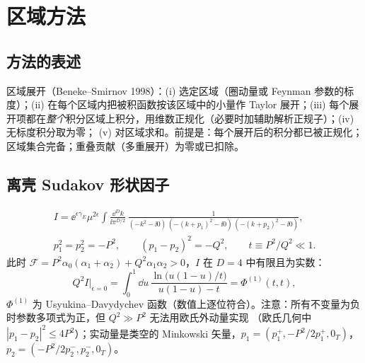 \section{区域方法}
\label{sec:regions}

\subsection{方法的表述}

区域展开（Beneke--Smirnov 1998）：(i) 选定区域（圈动量或 Feynman 参数的标度）；(ii) 在每个区域内把被积函数按该区域中的小量作
Taylor 展开；(iii) 每个展开项都在\emph{整个}积分区域上积分，用维数正规化（必要时加辅助解析正规子）；(iv) 无标度积分取为零；
(v) 对区域求和。前提是：每个展开后的积分都已被正规化；区域集合完备；重叠贡献（多重展开）为零或已扣除。

\subsection{离壳 Sudakov 形状因子}

\begin{gather}\label{eq:reg-I}
I=\ee^{\epsilon\gamma_E}\mu^{2\epsilon}\!\int\!\frac{\dd^Dk}{\ii\pi^{D/2}}\,
\frac{1}{(-k^2-\ii0)\,(-(k+p_1)^2-\ii0)\,(-(k+p_2)^2-\ii0)},\\
p_1^2=p_2^2=-P^2,\qquad (p_1-p_2)^2=-Q^2,\qquad t\equiv P^2/Q^2\ll1 .\nonumber
\end{gather}
此时 $\mathcal F=P^2\alpha_0(\alpha_1+\alpha_2)+Q^2\alpha_1\alpha_2>0$，$I$ 在 $D=4$ 中有限且为实数：
\begin{equation}\label{eq:reg-exact}
Q^2I\big|_{\epsilon=0}=\int_0^1\!\dd u\,\frac{\ln\big(u(1-u)/t\big)}{u(1-u)-t}=\Phi^{(1)}(t,t),
\end{equation}
$\Phi^{(1)}$ 为 Usyukina--Davydychev 函数（数值上逐位符合）。注意：所有不变量为负时参数多项式为正，但 $Q^2\gg P^2$ 无法用欧氏外动量实现
（欧氏几何中 $|p_1-p_2|^2\le4P^2$）；实动量是类空的 Minkowski 矢量，$p_1=(p_1^+,-P^2/2p_1^+,0_T)$，$p_2=(-P^2/2p_2^-,p_2^-,0_T)$。

